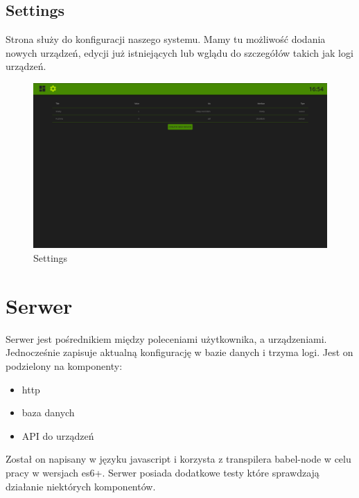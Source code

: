 \subsection{Settings}
Strona służy do konfiguracji naszego systemu. Mamy tu możliwość dodania nowych urządzeń, edycji już istniejących lub wglądu do szczegółów takich jak logi urządzeń.
\begin{figure}[h!]
  \includegraphics[width=\linewidth]{settings.png}
  \caption{Settings}
  \label{fig:settings}
\end{figure}
\newpage
\section{Serwer}
Serwer jest pośrednikiem między poleceniami użytkownika, a urządzeniami. Jednocześnie zapisuje aktualną konfigurację w bazie danych i trzyma logi. Jest on podzielony na komponenty:
\begin{itemize}
    \item http
    \item baza danych
    \item API do urządzeń
\end{itemize}
Został on napisany w języku javascript i korzysta z transpilera babel-node w celu pracy w wersjach es6+. Serwer posiada dodatkowe testy które sprawdzają działanie niektórych komponentów.
